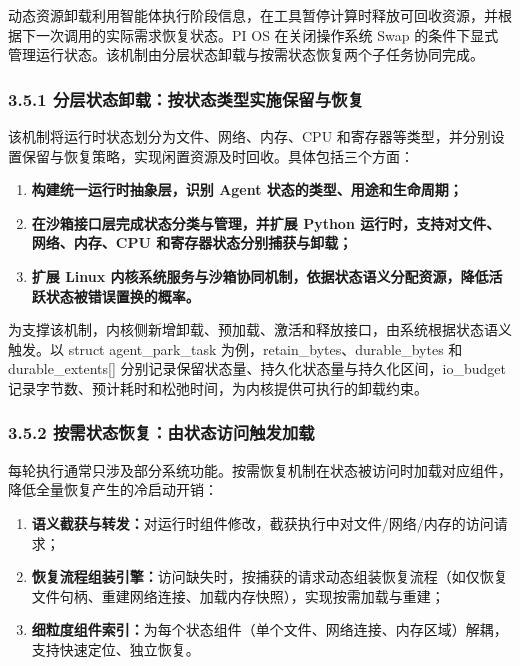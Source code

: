 动态资源卸载利用智能体执行阶段信息，在工具暂停计算时释放可回收资源，并根据下一次调用的实际需求恢复状态。PI OS 在关闭操作系统 Swap 的条件下显式管理运行状态。该机制由分层状态卸载与按需状态恢复两个子任务协同完成。

\subsubsection{3.5.1 分层状态卸载：按状态类型实施保留与恢复}\label{ux5206ux5c42ux72b6ux6001ux5378ux8f7dux6309ux72b6ux6001ux7c7bux578bux5b9eux65bdux4fddux7559ux4e0eux6062ux590d}

该机制将运行时状态划分为文件、网络、内存、CPU 和寄存器等类型，并分别设置保留与恢复策略，实现闲置资源及时回收。具体包括三个方面：

\begin{enumerate}

\item
  \textbf{构建统一运行时抽象层，识别 Agent 状态的类型、用途和生命周期；}
\item
  \textbf{在沙箱接口层完成状态分类与管理，并扩展 Python 运行时，支持对文件、网络、内存、CPU 和寄存器状态分别捕获与卸载；}
\item
  \textbf{扩展 Linux 内核系统服务与沙箱协同机制，依据状态语义分配资源，降低活跃状态被错误置换的概率。}
\end{enumerate}

为支撑该机制，内核侧新增卸载、预加载、激活和释放接口，由系统根据状态语义触发。以 struct agent\_park\_task 为例，retain\_bytes、durable\_bytes 和 durable\_extents{[}{]} 分别记录保留状态量、持久化状态量与持久化区间，io\_budget 记录字节数、预计耗时和松弛时间，为内核提供可执行的卸载约束。

\subsubsection{3.5.2 按需状态恢复：由状态访问触发加载}\label{ux6309ux9700ux72b6ux6001ux6062ux590dux7531ux72b6ux6001ux8bbfux95eeux89e6ux53d1ux52a0ux8f7d}

每轮执行通常只涉及部分系统功能。按需恢复机制在状态被访问时加载对应组件，降低全量恢复产生的冷启动开销：

\begin{enumerate}

\item
  \textbf{语义截获与转发：}对运行时组件修改，截获执行中对文件/网络/内存的访问请求；
\item
  \textbf{恢复流程组装引擎：}访问缺失时，按捕获的请求动态组装恢复流程（如仅恢复文件句柄、重建网络连接、加载内存快照），实现按需加载与重建；
\item
  \textbf{细粒度组件索引：}为每个状态组件（单个文件、网络连接、内存区域）解耦，支持快速定位、独立恢复。
\end{enumerate}

